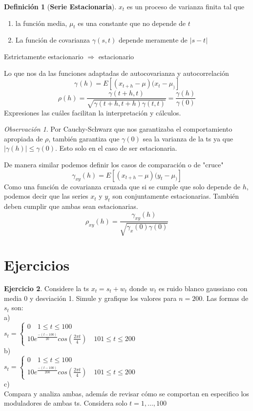 \documentclass[11pt,a4paper,oneside]{report}
\theoremstyle{definition}
\newtheorem{definicion}{Definición}[chapter]
\newtheorem{ejercicio}[definicion]{Ejercicio}
\theoremstyle{plain}
\theoremstyle{remark}
\newtheorem*{observacion}{Observación}
\newcommand{\termino}[1]{\textbf{#1}\index{#1}}
\begin{document}
\begin{definicion}[\termino{Serie Estacionaria}]
  $x_t$ es un proceso de varianza finita tal que 
  \begin{enumerate}
    \item la función media, $\mu_t$ es una constante que no depende de $t$ 
    \item La función de covarianza $\gamma(s,t)$ depende meramente de $|s-t|$
  \end{enumerate}
  Estrictamente estacionario $\Rightarrow$ estacionario
\end{definicion}

Lo que nos da las funciones adaptadas de autocovarianza y autocorrelación
  \[\gamma_{}(h)=E[(x_{t+h}-\mu)(x_t -\mu_)]\]
  \[ \rho(h)=\frac{\gamma (t+h,t)}{\sqrt{\gamma(t+h,t+h)\gamma(t,t)}}=\frac{\gamma(h)}{\gamma(0)} \]
Expresiones las cuáles facilitan la interpretación y cálculos.
\begin{observacion}
  Por Cauchy-Schwarz que nos garantizaba el comportamiento apropiada de $\rho$, también garantiza que 
  $\gamma (0)$ sea la varianza de la ts ya que $|\gamma(h)|\leq \gamma(0)$. Esto solo en el caso de 
  ser estacionaria.
\end{observacion}
De manera similar podemos definir los casos de comparación o de "cruce"
  \[\gamma_{xy}(h)=E[(x_{t+h}-\mu)(y_t -\mu_)]\]
  Como una función de covarianza cruzada que si se cumple que solo depende de $h$, podemos 
  decir que las series $x_t$ y $y_t$ son conjuntamente estacionarias. También deben cumplir 
  que ambas sean estacionarias.
  \[ \rho_{xy}(h)=\frac{\gamma_{xy}(h)}{\sqrt{\gamma_x(0)\gamma(0)}}\]

\section{Ejercicios}
\begin{ejercicio}
Considere la ts $x_t=s_t+w_t$ donde $w_t$ es ruido blanco gaussiano con media 0 y desviación 1. 
Simule y grafique los valores para $n=200$. Las formas de $s_t$ son:\\

a)\\
$s_t=\left\{
  \begin{array}{l}
    0 \quad 1 \leq t \leq 100 \\
    10e^{\frac{-(t-100)}{20}}cos(\frac{2 \pi t}{4}) \quad 101\leq t \leq 200
  \end{array}
\right.$\\

b)\\
$s_t=\left\{
  \begin{array}{l}
    0 \quad 1 \leq t \leq 100 \\
    10e^{\frac{-(t-100)}{200}}cos(\frac{2 \pi t}{4}) \quad 101\leq t \leq 200
  \end{array}
\right.$\\

c)\\
Compara y analiza ambas, además de revisar cómo se comportan en especifico los moduladores
de ambas ts. Considera solo $t=1,...,100$

\end{ejercicio}
\end{document}
